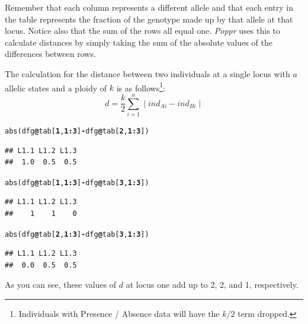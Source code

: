 \documentclass[letterpaper]{article}\usepackage[]{graphicx}\usepackage[]{color}
\makeatletter
\newcommand{\hlnum}[1]{\textcolor[rgb]{0.502,0,0.502}{\textbf{#1}}}%
\newcommand{\hlopt}[1]{\textcolor[rgb]{1,0,0.502}{\textbf{#1}}}%
\newcommand{\hlstd}[1]{\textcolor[rgb]{0,0,0}{#1}}%
\newcommand{\hlkwc}[1]{\textcolor[rgb]{0,0.502,0.753}{#1}}%
\newcommand{\hlkwd}[1]{\textcolor[rgb]{0,0.267,0.4}{#1}}%
\newenvironment{kframe}{%
 \def\at@end@of@kframe{}%
 \ifinner\ifhmode%
  \def\at@end@of@kframe{\end{minipage}}%
  \begin{minipage}{\columnwidth}%
 \fi\fi%
 \def\FrameCommand##1{\hskip\@totalleftmargin \hskip-\fboxsep
 \colorbox{shadecolor}{##1}\hskip-\fboxsep
     \hskip-\linewidth \hskip-\@totalleftmargin \hskip\columnwidth}%
 \MakeFramed {\advance\hsize-\width
   \@totalleftmargin\z@ \linewidth\hsize
   \@setminipage}}%
 {\par\unskip\endMakeFramed%
 \at@end@of@kframe}
\newenvironment{knitrout}{}{} %
\newcommand{\Poppr}{\textit{Poppr}}
\makeatother
\begin{document}
Remember that each column represents a different allele and that each entry in the table represents the fraction of the genotype made up by that allele at that locus. Notice also that the sum of the rows all equal one. \Poppr{} uses this to calculate distances by simply taking the sum of the absolute values of the differences between rows.

The calculation for the distance between two individuals at a single locus with $a$ allelic states and a ploidy of $k$ is as follows\footnote{Individuals with Presence / Absence data will have the $k/2$ term dropped.}:
\begin{equation}
\label{eq:ia_d}
d = \displaystyle \frac{k}{2}\sum_{i=1}^{a} \mid ind_{Ai} - ind_{Bi}\mid
\end{equation}
\begin{knitrout}\footnotesize
{}\color{fgcolor}\begin{kframe}
\begin{alltt}
\hlkwd{abs}\hlstd{(dfg}\hlopt{@}\hlkwc{tab}\hlstd{[}\hlnum{1}\hlstd{,} \hlnum{1}\hlopt{:}\hlnum{3}\hlstd{]} \hlopt{-} \hlstd{dfg}\hlopt{@}\hlkwc{tab}\hlstd{[}\hlnum{2}\hlstd{,} \hlnum{1}\hlopt{:}\hlnum{3}\hlstd{])}
\end{alltt}
\begin{verbatim}
## L1.1 L1.2 L1.3 
##  1.0  0.5  0.5
\end{verbatim}
\begin{alltt}
\hlkwd{abs}\hlstd{(dfg}\hlopt{@}\hlkwc{tab}\hlstd{[}\hlnum{1}\hlstd{,} \hlnum{1}\hlopt{:}\hlnum{3}\hlstd{]} \hlopt{-} \hlstd{dfg}\hlopt{@}\hlkwc{tab}\hlstd{[}\hlnum{3}\hlstd{,} \hlnum{1}\hlopt{:}\hlnum{3}\hlstd{])}
\end{alltt}
\begin{verbatim}
## L1.1 L1.2 L1.3 
##    1    1    0
\end{verbatim}
\begin{alltt}
\hlkwd{abs}\hlstd{(dfg}\hlopt{@}\hlkwc{tab}\hlstd{[}\hlnum{2}\hlstd{,} \hlnum{1}\hlopt{:}\hlnum{3}\hlstd{]} \hlopt{-} \hlstd{dfg}\hlopt{@}\hlkwc{tab}\hlstd{[}\hlnum{3}\hlstd{,} \hlnum{1}\hlopt{:}\hlnum{3}\hlstd{])}
\end{alltt}
\begin{verbatim}
## L1.1 L1.2 L1.3 
##  0.0  0.5  0.5
\end{verbatim}
\end{kframe}
\end{knitrout}

As you can see, these values of $d$ at locus one add up to 2, 2, and 1, respectively.
\end{document}
